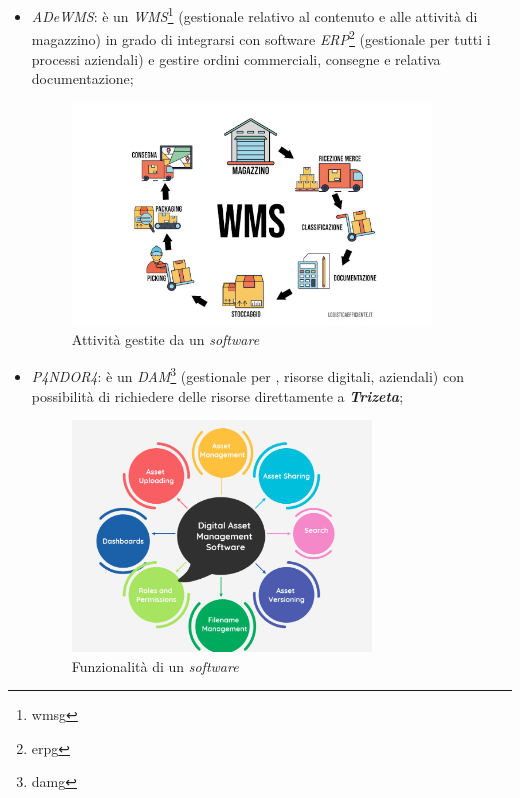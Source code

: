 \begin{itemize}
    \item \textit{ADeWMS}: è un \textit{WMS}\footnote{\gls{wmsg}} (gestionale relativo al contenuto e alle attività di magazzino) in grado di integrarsi con software \textit{ERP}\footnote{\gls{erpg}} (gestionale per tutti i processi aziendali) e gestire ordini commerciali, consegne e relativa documentazione;
    \begin{figure}[H]
        \centering
        \includegraphics[width=0.9\textwidth]{images/wms.jpg}
        \caption[Funzionalità di un \textit{software WMS}]{Attività gestite da un \textit{software } \footnotemark}
    \end{figure}
    {}
    
    \item \textit{P4NDOR4}: è un \textit{DAM}\footnote{\gls{damg}} (gestionale per , risorse digitali, aziendali) con possibilità di richiedere delle risorse direttamente a \textit{\textbf{Trizeta}};
    \begin{figure}[H]
        \centering
        \includegraphics[width=0.75\textwidth]{images/dam.png}
        \caption[Funzionalità di un \textit{software DAM}]{Funzionalità di un \textit{software } \footnotemark}
    \end{figure}
    {}


\end{itemize}
